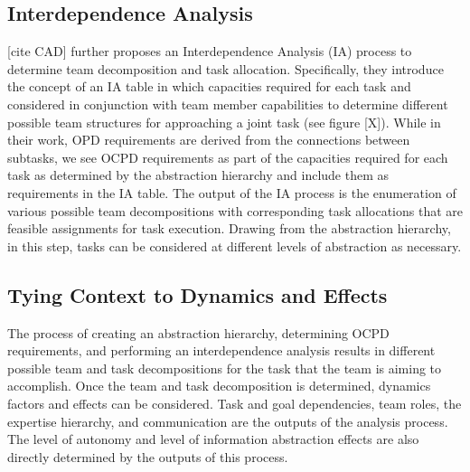 \documentclass[letterpaper, 10 pt, conference]{ieeeconf}  %
\theoremstyle{definition}
\begin{document}
\subsection{Interdependence Analysis}
\label{sec:IA}
[cite CAD] further proposes an Interdependence Analysis (IA) process to determine team decomposition and task allocation. Specifically, they introduce the concept of an IA table in which capacities required for each task and considered in conjunction with team member capabilities to determine different possible team structures for approaching a joint task (see figure [X]). While in their work, OPD requirements are derived from the connections between subtasks, we see OCPD requirements as part of the capacities required for each task as determined by the abstraction hierarchy and include them as requirements in the IA table. The output of the IA process is the enumeration of various possible team decompositions with corresponding task allocations that are feasible assignments for task execution. Drawing from the abstraction hierarchy, in this step, tasks can be considered at different levels of abstraction as necessary. 

\subsection{Tying Context to Dynamics and Effects}
The process of creating an abstraction hierarchy, determining OCPD requirements, and performing an interdependence analysis results in different possible team and task decompositions for the task that the team is aiming to accomplish. Once the team and task decomposition is determined, dynamics factors and effects can be considered. Task and goal dependencies, team roles, the expertise hierarchy, and communication are the outputs of the analysis process. The level of autonomy and level of information abstraction effects are also directly determined by the outputs of this process.


\newpage
\pagebreak
\clearpage

\end{document}
